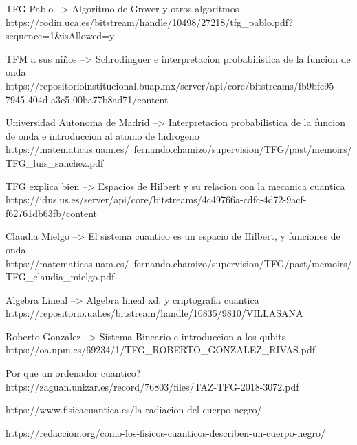 \documentclass{article}
\begin{document}
    TFG Pablo --> Algoritmo de Grover y otros algoritmos
    https://rodin.uca.es/bitstream/handle/10498/27218/tfg_pablo.pdf?sequence=1&isAllowed=y

    TFM a sus niños --> Schrodinguer e interpretacion probabilistica de la funcion de onda
    https://repositorioinstitucional.buap.mx/server/api/core/bitstreams/fb9bfe95-7945-404d-a3c5-00ba77b8ad71/content

    Universidad Autonoma de Madrid --> Interpretacion probabilistica de la funcion de onda e introduccion al atomo de hidrogeno
    https://matematicas.uam.es/~fernando.chamizo/supervision/TFG/past/memoirs/TFG_luis_sanchez.pdf

    TFG explica bien --> Espacios de Hilbert y su relacion con la mecanica cuantica
    https://idus.us.es/server/api/core/bitstreams/4c49766a-cdfc-4d72-9acf-f62761db63fb/content

    Claudia Mielgo --> El sistema cuantico es un espacio de Hilbert, y funciones de onda 
    https://matematicas.uam.es/~fernando.chamizo/supervision/TFG/past/memoirs/TFG_claudia_mielgo.pdf

    Algebra Lineal --> Algebra lineal xd, y criptografia cuantica
    https://repositorio.ual.es/bitstream/handle/10835/9810/VILLASANA%

    Roberto Gonzalez --> Sistema Bineario e introduccion a los qubits
    https://oa.upm.es/69234/1/TFG_ROBERTO_GONZALEZ_RIVAS.pdf

    Por que un ordenador cuantico?
    https://zaguan.unizar.es/record/76803/files/TAZ-TFG-2018-3072.pdf

    https://www.fisicacuantica.es/la-radiacion-del-cuerpo-negro/

    https://redaccion.org/como-los-fisicos-cuanticos-describen-un-cuerpo-negro/
    
\end{document}
